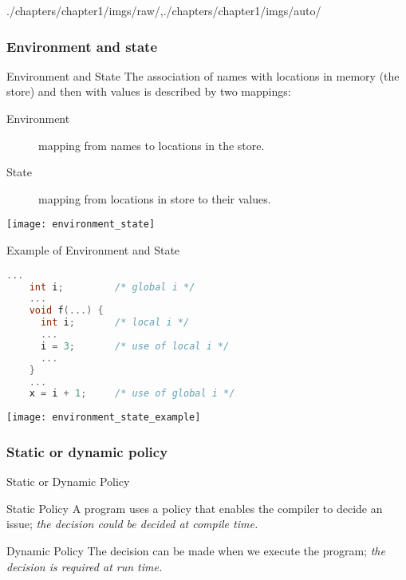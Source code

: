 \begin{graphicspathcontext}{{./chapters/chapter1/imgs/raw/},{./chapters/chapter1/imgs/auto/}}
\begin{bibunit}[apalike]
\subsubsection{Environment and state}
\begin{frame}{Environment and State}
	The association of names with locations in memory (the store) and then with values is described by two mappings:
	\begin{description}
	\item[Environment] mapping from names to locations in the store.
	\item[State] mapping from locations in store to their values.
	\end{description}
	\vfill
	\begin{center}
	\texttt{[image: environment\_state]}
	\end{center}
\end{frame}

\begin{frame}[b,fragile]{Example of Environment and State}
	\begin{lstlisting}[language=C]
	...
	int i;         /* global i */
	...
	void f(...) {
	  int i;       /* local i */
	  ...
	  i = 3;       /* use of local i */
	  ...
	}
	...
	x = i + 1;     /* use of global i */
	\end{lstlisting}
	\vfill
	\begin{center}
	\texttt{[image: environment\_state\_example]}
	\end{center}
\end{frame}

\subsubsection{Static or dynamic policy}
\begin{frame}{Static or Dynamic Policy}
	\begin{block}{Static Policy}
	A program uses a policy that enables the compiler to decide an issue; \emph{the decision could be decided at compile time.}
	\end{block}
	\begin{block}{Dynamic Policy}
	The decision can be made when we execute the program; \emph{the decision is required at run time.}
	\end{block}
\end{frame}


\end{bibunit}
\end{graphicspathcontext}

